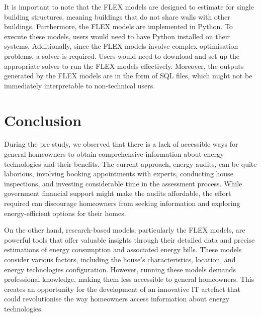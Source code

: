 %
%

It is important to note that the FLEX models are designed to estimate for single building structures, meaning buildings that do not share walls with other buildings. 
Furthermore, the FLEX models are implemented in Python. 
To execute these models, users would need to have Python installed on their systems. 
Additionally, since the FLEX models involve complex optimisation problems, a solver is required. 
Users would need to download and set up the appropriate solver to run the FLEX models effectively.
Moreover, the outputs generated by the FLEX models are in the form of SQL files, 
which might not be immediately interpretable to non-technical users.


\section{Conclusion}

During the pre-study, we observed that 
there is a lack of accessible ways for general homeowners to obtain comprehensive information about energy technologies and their benefits. 
The current approach, energy audits, can be quite laborious, 
involving booking appointments with experts, conducting house inspections, and investing considerable time in the assessment process. 
While government financial support might make the audits affordable, 
the effort required can discourage homeowners from seeking information and exploring energy-efficient options for their homes.

On the other hand, research-based models, particularly the FLEX models, 
are powerful tools that offer valuable insights through their detailed data and precise estimations of energy consumption and associated energy bills. 
These models consider various factors, including the house's characteristics, location, and energy technologies configuration. 
However, running these models demands professional knowledge, making them less accessible to general homeowners.
This creates an opportunity for the development of an innovative IT artefact that could revolutionise the way homeowners access information about energy technologies. 